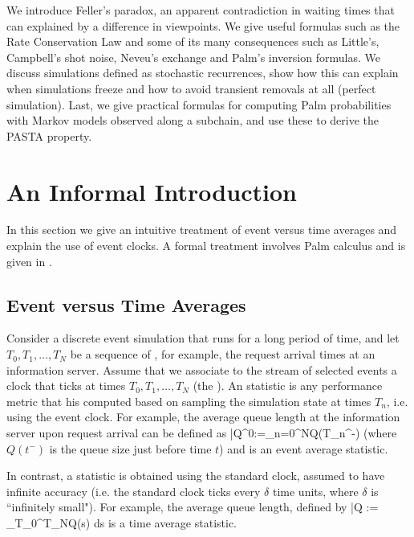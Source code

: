 We introduce Feller's paradox, an apparent contradiction in
waiting times that can explained by a difference in viewpoints.
We give useful formulas such as the Rate Conservation Law and
some of its many consequences such as Little's, Campbell's shot
noise, Neveu's exchange and Palm's inversion formulas. We
discuss simulations defined as stochastic recurrences, show how
this can explain when simulations freeze and how to avoid
transient removals at all (perfect simulation). Last, we give
practical formulas for computing Palm probabilities with Markov
models observed along a subchain, and use these to derive the
PASTA property.
\minitoc
%
\section{An Informal Introduction}
\label{sec-event-time}

In this section we give an intuitive treatment of event versus time
averages and explain the use of event clocks. A formal treatment
involves Palm calculus and is given in .

\subsection{Event versus Time Averages} Consider a discrete event simulation that
runs for a long period of time, and let $T_0, T_1, \ldots, T_N$ be a
sequence of , for example, the request arrival
times at an information server.
 Assume that we associate to the stream of selected events a clock
 that ticks at times $T_0, T_1, \ldots, T_N$ (the ).
 An  statistic is any performance
metric that his computed based on sampling the simulation state at
times $T_n$, i.e. using the event clock.
For example, the average queue length at the information server upon
request arrival can be defined as
 \ben \bar{Q}^0:=\sum_{n=0}^N{Q(T_n^-)}
 \een
 (where $Q(t^-)$ is the queue size just before time $t$)
 and is an event average statistic.

In contrast, a  statistic is obtained using the
standard clock, assumed to have infinite accuracy (i.e. the standard
clock ticks every $\delta$ time units, where $\delta$ is
``infinitely small"). For example, the average queue length, defined
by
 \ben \bar{Q} := \int_{T_0}^{T_N}Q(s)
 ds
 \een
is a time average statistic.

